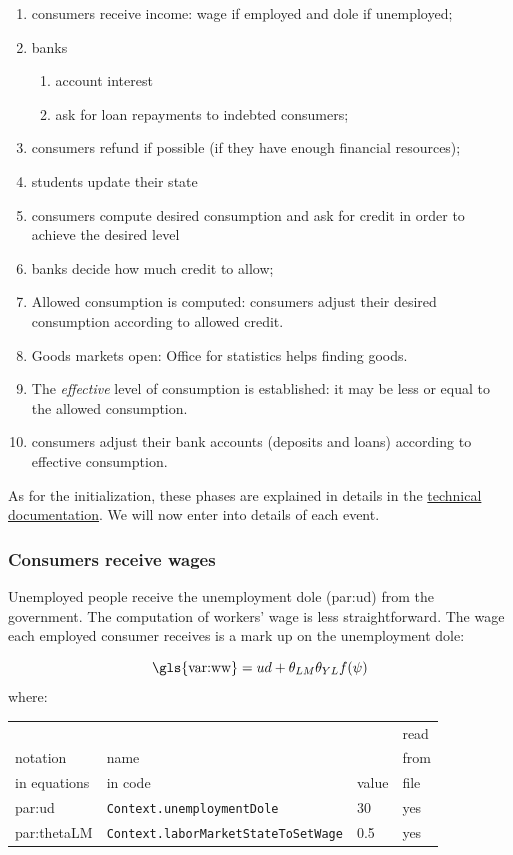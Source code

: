 \documentclass{book}
\newcommand{\doclocation}{file:///Users/giulioni/Documents/workspace/gabriele/docs}
\begin{document}
\begin{enumerate}
	\item consumers receive income: wage if employed and dole if unemployed;
	\item banks 
		\begin{enumerate}
			\item account interest
			\item ask for loan repayments to indebted consumers;
		\end{enumerate}
	\item consumers refund if possible (if they have enough financial resources);
	\item students update their state
	\item consumers compute desired consumption and ask for credit in order to achieve the desired level 
	\item banks decide how much credit to allow;
	\item Allowed consumption is computed: consumers adjust their desired consumption according to allowed credit. 
	\item Goods markets open: Office for statistics helps finding goods.
	\item The \textit{effective} level of consumption is established: it may be less or equal to the allowed consumption.
	\item consumers adjust their bank accounts (deposits and loans) according to effective consumption.
\end{enumerate}

As for the initialization, these phases are explained in details in the \href{\doclocation/index_loop.html}{technical documentation}.
We will now enter into details of each event.

\subsubsection{Consumers receive wages}

Unemployed people receive the unemployment dole (\gls{par:ud}) from the government.
The computation of workers' wage is less straightforward. The wage each employed consumer receives is a mark up on the unemployment dole: 

\begin{equation}
	\textnormal{\gls{var:ww}}=ud+\theta_{LM}\theta_{YL}f(\psi)
	\label{eq:ww}
\end{equation}
where:\\

\vskip2mm
\noindent
\begin{tabular}{l l l l}
	\hline
	& &&read\\
	notation& name &&from\\
	in equations& in code&value&file\\
	\hline
	\hline
\gls{par:ud}&\verb+Context.unemploymentDole+&30&yes\\
\gls{par:thetaLM}&\verb+Context.laborMarketStateToSetWage+&0.5&yes\\
	\hline
\end{tabular}
\end{document}
